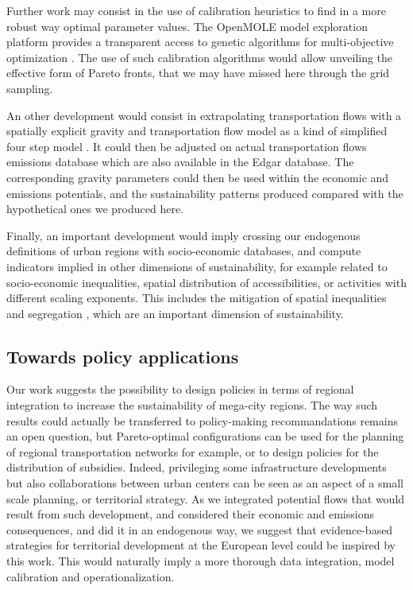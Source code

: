 \documentclass{jimis-en}
\begin{document}
Further work may consist in the use of calibration heuristics to find in a more robust way optimal parameter values. The OpenMOLE model exploration platform provides a transparent access to genetic algorithms for multi-objective optimization \citep{reuillon2013openmole}. The use of such calibration algorithms would allow unveiling the effective form of Pareto fronts, that we may have missed here through the grid sampling.


An other development would consist in extrapolating transportation flows with a spatially explicit gravity and transportation flow model as a kind of simplified four step model \citep{mcnally2000four}. It could then be adjusted on actual transportation flows emissions database which are also available in the Edgar database. The corresponding gravity parameters could then be used within the economic and emissions potentials, and the sustainability patterns produced compared with the hypothetical ones we produced here.

Finally, an important development would imply crossing our endogenous definitions of urban regions with socio-economic databases, and compute indicators implied in other dimensions of sustainability, for example related to socio-economic inequalities, spatial distribution of accessibilities, or activities with different scaling exponents. This includes the mitigation of spatial inequalities and segregation \citep{tammaru2015multi}, which are an important dimension of sustainability.



\subsection{Towards policy applications}


Our work suggests the possibility to design policies in terms of regional integration to increase the sustainability of mega-city regions. The way such results could actually be transferred to policy-making recommandations remains an open question, but Pareto-optimal configurations can be used for the planning of regional transportation networks for example, or to design policies for the distribution of subsidies. Indeed, privileging some infrastructure developments but also collaborations between urban centers can be seen as an aspect of a small scale planning, or territorial strategy. As we integrated potential flows that would result from such development, and considered their economic and emissions consequences, and did it in an endogenous way, we suggest that evidence-based strategies for territorial development at the European level could be inspired by this work. This would naturally imply a more thorough data integration, model calibration and operationalization.
\end{document}

